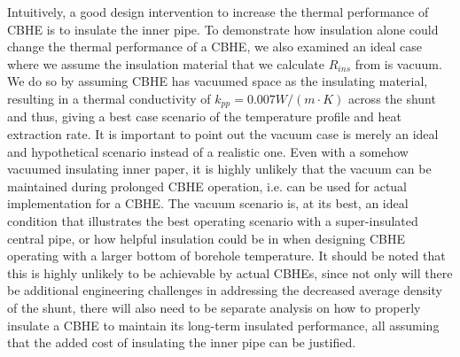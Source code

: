         Intuitively, a good design intervention to increase the thermal performance of CBHE is to insulate the inner pipe. To demonstrate how insulation alone could change the thermal performance of a CBHE, we also examined an ideal case where we assume the insulation material that we calculate $R_{ins}$ from is vacuum. We do so by assuming CBHE has vacuumed space as the insulating material, resulting in a thermal conductivity of $k_{pp}=0.007 W/(m\cdot K)$ across the shunt and thus, giving a best case scenario of the temperature profile and heat extraction rate. It is important to point out the vacuum case is merely an ideal and hypothetical scenario instead of a realistic one. Even with a somehow vacuumed insulating inner paper, it is highly unlikely that the vacuum can be maintained during prolonged CBHE operation, i.e. can be used for actual implementation for a CBHE. The vacuum scenario is, at its best, an ideal condition that illustrates the best operating scenario with a super-insulated central pipe, or how helpful insulation could be in when designing CBHE operating with a larger bottom of borehole temperature. It should be noted that this is highly unlikely to be achievable by actual CBHEs, since not only will there be additional engineering challenges in addressing the decreased average density of the shunt, there will also need to be separate analysis on how to properly insulate a CBHE to maintain its long-term insulated performance, all assuming that the added cost of insulating the inner pipe can be justified. 

